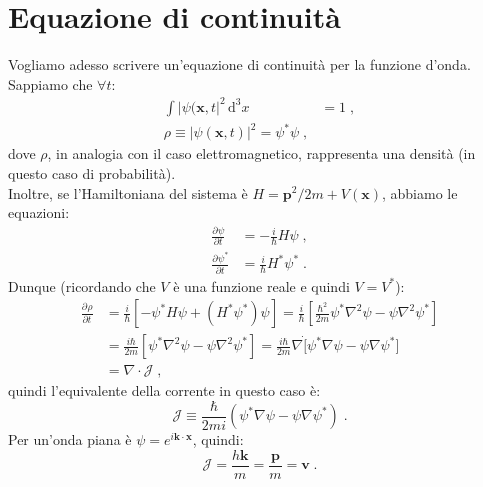 \documentclass[12pt,a4paper]{report}
\theoremstyle{definition}
\newcommand{\pdev}[3][]{\frac{\partial^{#1} #2}{\partial #3^{#1}}}
\numberwithin{equation}{section}
\newcommand{\diff}[1][]{\mathrm{d}#1}
\begin{document}
\section{Equazione di continuità}
Vogliamo adesso scrivere un'equazione di continuità per la funzione d'onda. Sappiamo che $\forall t$:
\begin{align*}
\int |\psi(\mathbf{x},t|^2\,\diff^3{x} &= 1\;, \\
\rho\equiv |\psi(\mathbf{x},t)|^2=\psi^*\psi\;,
\end{align*}
dove $\rho$, in analogia con il caso elettromagnetico, rappresenta una densità (in questo caso di probabilità). \\
Inoltre, se l'Hamiltoniana del sistema è $H=\mathbf{p}^2/2m+V(\mathbf{x})$, abbiamo le equazioni:
\begin{align}
\pdev{\psi}{t}&=-\frac{i}{\hbar}H\psi\;, \\
\pdev{\psi^*}{t}&= \frac{i}{\hbar}H^*\psi^*\;.
\end{align}
Dunque (ricordando che $V$ è una funzione reale e quindi $V=V^*$):
\begin{align*}
\pdev{\rho}{t}&=\frac{i}{\hbar}[-\psi^*H\psi+(H^*\psi^*)\psi]=\frac{i}{\hbar}\left[\frac{\hbar^2}{2m} \psi^*
\nabla^2\psi-\psi\nabla^2 \psi^*\right] \\
&= \frac{i\hbar}{2m}[\psi^*\nabla^2\psi-\psi\nabla^2\psi^*]=\frac{i\hbar}{2m}\nabla\dot[\psi^*\nabla\psi-\psi\nabla\psi^*] \\
&=\nabla\cdot \boldsymbol{\mathcal{J}}\;,
\end{align*}
quindi l'equivalente della corrente in questo caso è:
\begin{equation}
\boldsymbol{\mathcal{J}}\equiv \frac{\hbar}{2mi}(\psi^*\nabla\psi-\psi\nabla\psi^*)\;.
\end{equation}
Per un'onda piana è $\psi=e^{i\mathbf{k}\cdot\mathbf{x}}$, quindi:
$$
\boldsymbol{\mathcal{J}}=\frac{h\mathbf{k}}{m}=\frac{\mathbf{p}}{m}=\mathbf{v}\;.
$$
\end{document}
